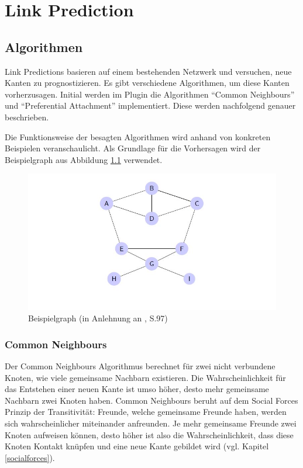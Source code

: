 \chapter{Link Prediction}

\section{Algorithmen}
Link Predictions basieren auf einem bestehenden Netzwerk und versuchen, neue Kanten zu prognostizieren.
Es gibt verschiedene Algorithmen, um diese Kanten vorherzusagen.
Initial werden im Plugin die Algorithmen ``Common Neighbours'' und ``Preferential Attachment'' implementiert. Diese werden nachfolgend genauer beschrieben.

Die Funktionsweise der besagten Algorithmen wird anhand von konkreten Beispielen veranschaulicht.
Als Grundlage für die Vorhersagen wird der Beispielgraph aus Abbildung \ref{fig:graph_bsp} verwendet.

\begin{figure}[h]
    \centering
    \includegraphics[scale=0.7]{resources/graph_example.JPG}
    \caption{Beispielgraph (in Anlehnung an \citeauthor{michael_henninger_soziale_2018} \citeyear{michael_henninger_soziale_2018}, S.97)}
    \label{fig:graph_bsp}
\end{figure}

\subsection{Common Neighbours}
Der Common Neighbours Algorithmus berechnet für zwei nicht verbundene Knoten, wie viele gemeinsame Nachbarn existieren.
Die Wahrscheinlichkeit für das Entstehen einer neuen Kante ist umso höher, desto mehr gemeinsame Nachbarn zwei
Knoten haben. Common Neighbours beruht auf dem Social Forces Prinzip der Transitivität: Freunde, welche gemeinsame
Freunde haben, werden sich wahrscheinlicher miteinander anfreunden. Je mehr gemeinsame Freunde zwei Knoten aufweisen können, desto
höher ist also die Wahrscheinlichkeit, dass diese Knoten Kontakt knüpfen und eine neue Kante gebildet wird (vgl. Kapitel \ref{socialforces}).

